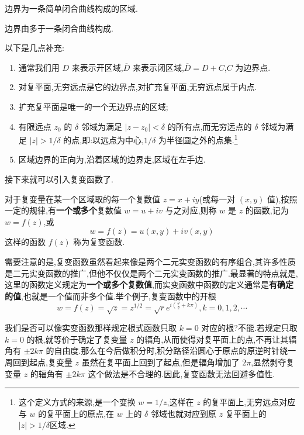 \documentclass[UTF8]{ctexbook}
\begin{document}
\begin{definition}[单连通区域]
    边界为一条简单闭合曲线构成的区域.
\end{definition}

\begin{definition}[复连通区域]
    边界由多于一条闭合曲线构成.
\end{definition}

以下是几点补充:
\begin{enumerate}
    \item 通常我们用 $D$ 来表示开区域,$\overline{D}$ 来表示闭区域,$\overline{D}=D+C$,$C$ 为边界点.
    \item 对复平面,无穷远点是它的边界点,对扩充复平面,无穷远点属于内点.
    \item 扩充复平面是唯一的一个无边界点的区域;
    \item 有限远点 $z_0$ 的 $\delta$ 邻域为满足 $|z-z_0|<\delta$ 的所有点,而无穷远点的 $\delta$ 邻域为满足 $|z|>1/\delta$ 的点,即:以远点为中心,$1/\delta$ 为半径圆之外的点集.\footnote{这个定义方式的来源,是一个变换 $w=1/z$,这样在 $z$ 的复平面上,无穷远点对应与 $w$ 的复平面上的原点,在 $w$ 上的 $\delta$ 邻域也就对应到原 $z$ 复平面上的 $|z|>1/\delta$区域.}
    \item 区域边界的正向为,沿着区域的边界走,区域在左手边.
\end{enumerate}

接下来就可以引入复变函数了.
\begin{definition}[复变函数]
    对于复变量在某一个区域取的每一个复数值 $z=x+iy$(或每一对 $(x,y)$ 值),按照一定的规律,有\textbf{一个或多个}复数值 $w=u+iv$ 与之对应,则称 $w$ 是 $z$ 的函数,记为 $w=f(z)$,或
    \[
        w=f(z)=u(x,y)+iv(x,y)
    \]
    这样的函数 $f(z)$ 称为复变函数.
\end{definition}

需要注意的是,复变函数虽然看起来像是两个二元实变函数的有序组合,其许多性质是二元实变函数的推广,但他不仅仅是两个二元实变函数的推广.最显著的特点就是,这里的函数定义规定为\textbf{一个或多个复数值},而实变函数中函数的定义通常是\textbf{有确定的值},也就是一个值而非多个值.举个例子,复变函数中的开根
\[
w=f(z) = \sqrt{z} = z^{1/2} = \sqrt{r}e^{i\left( \frac{\theta}{2} + k\pi \right)},k=0,1,2,\cdots
\]

我们是否可以像实变函数那样规定根式函数只取 $k=0$ 对应的根?不能.若规定只取 $k=0$ 的根,就等价于确定了复变量 $z$ 的辐角,从而使得对复平面上的点,不再让其辐角有 $\pm 2k\pi$ 的自由度.那么在今后做积分时,积分路径沿圆心于原点的原逆时针绕一周回到起点,复变量 $z$ 虽然在复平面上回到了起点,但是辐角增加了 $2\pi$,显然剥夺复变量 $z$ 的辐角有 $\pm 2k\pi$ 这个做法是不合理的.因此,复变函数无法回避多值性.
\end{document}
